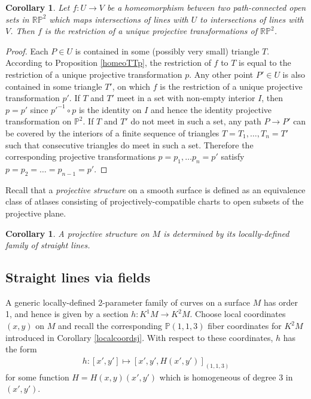 \documentclass[12pt]{article}
\numberwithin{equation}{section}
\theoremstyle{plain}
\newtheorem{corollary}[definition]{Corollary}
\theoremstyle{definition}
\renewcommand{\P}{\mathbb{P}}
\newcommand{\RP}{\mathbb{RP}}
\newcommand{\ra}{\rightarrow}
\begin{document}
\begin{corollary}\label{homeoUV} Let $f:U\ra V$ be a homeomorphism between two path-connected open sets in $\RP^{2}$ which maps intersections of lines with $U$ to intersections of lines with $V$. Then $f$ is the restriction of a unique projective transformations of $\RP^{2}$.
\end{corollary}
\begin{proof} Each $P\in U$ is contained in some (possibly very small) triangle $T$. According to Proposition \ref{homeoTTp}, the restriction of $f$ to $T$ is equal to the restriction of a unique projective transformation $p$. Any other point $P'\in U$ is also contained in some triangle $T'$, on which $f$ is the restriction of a unique projective transformation $p'$. If $T$ and $T'$ meet in a set with non-empty interior $I$, then $p=p'$ since $p'^{-1}\circ p$ is the identity on $I$ and hence the identity projective transformation on $\P^{2}$. If $T$ and $T'$ do not meet in such a set, any path $P\ra P'$ can be covered by the interiors of a finite sequence of triangles $T=T_1,\dots,T_n=T'$ such that consecutive triangles do meet in such a set. Therefore the corresponding projective transformations $p=p_1,\dots p_n=p'$ satisfy $p=p_2=\dots=p_{n-1}=p'$.
\end{proof}
Recall that a \emph{projective structure} on a smooth surface is defined as an equivalence class of atlases consisting of projectively-compatible charts to open subsets of the projective plane.
\begin{corollary}\label{notsheafproj} A projective structure on $M$ is determined by its locally-defined family of straight lines.
\end{corollary}
\subsection{Straight lines via fields}

A generic locally-defined 2-parameter family of curves on a surface $M$ has order 1, and hence is given by a section $h:K^{1}M\ra K^{2}M$. Choose local coordinates $(x,y)$ on $M$ and recall the corresponding $\P(1,1,3)$ fiber coordinates for $K^{2}M$ introduced in Corollary \ref{localcoordsj}. With respect to these coordinates, $h$ has the form
\begin{align*}
h:[x',y']\mapsto[x',y',H(x',y')]_{(1,1,3)}
\end{align*}
for some function $H=H(x,y)(x',y')$ which is homogeneous of degree $3$ in $(x',y')$.
\end{document}
